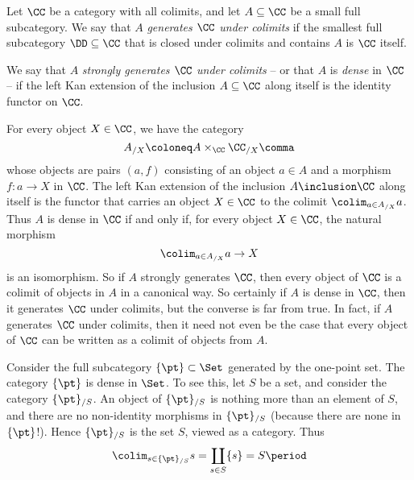 \begin{definition}
  Let $\CC$ be a category with all colimits, and let $A \subseteq \CC$ be a small full subcategory.
  We say that $A$ \emph{generates $\CC$ under colimits} if the smallest full subcategory $\DD \subseteq \CC$ that is closed under colimits and contains $A$ is $\CC$ itself.

  We say that $A$ \emph{strongly generates $\CC$ under colimits} -- or that $A$ is \emph{dense} in $\CC$ -- if the left Kan extension of the inclusion $A \subseteq \CC$ along itself is the identity functor on $\CC$.
\end{definition}

For every object $X \in \CC$, we have the category
\[
  A_{/X} \coloneq A \times_{\CC} \CC_{/X} \comma
\]
whose objects are pairs $(a,f)$ consisting of an object $a \in A$ and a morphism $f \colon a \to X$ in $\CC$.
The left Kan extension of the inclusion $A \inclusion \CC$ along itself is the functor that carries an object $X \in \CC$ to the colimit $\colim_{a \in A_{/X}} a$.
Thus $A$ is dense in $\CC$ if and only if, for every object $X \in \CC$, the natural morphism
\[
  \colim_{a \in A_{/X}} a \to X
\]
is an isomorphism.
So if $A$ strongly generates $\CC$, then every object of $\CC$ is a colimit of objects in $A$ in a canonical way.
So certainly if $A$ is dense in $\CC$, then it generates $\CC$ under colimits, but the converse is far from true.
In fact, if $A$ generates $\CC$ under colimits, then it need not even be the case that every object of $\CC$ can be written as a colimit of objects from $A$.

\begin{eg}
  Consider the full subcategory $\{\pt\} \subset \Set$ generated by the one-point set.
  The category $\{\pt\}$ is dense in $\Set$.
  To see this, let $S$ be a set, and
  consider the category $\{\pt\}_{/S}$.
  An object of $\{\pt\}_{/S}$ is nothing more than an element of $S$,
  and there are no non-identity morphisms in $\{\pt\}_{/S}$ (because there are none in $\{\pt\}$!).
  Hence $\{\pt\}_{/S}$ is the set $S$, viewed as a category.
  Thus
  \[
    \colim_{s \in \{\pt\}_{/S}} s = \coprod_{s \in S} \{s\} = S \period
  \]
\end{eg}

